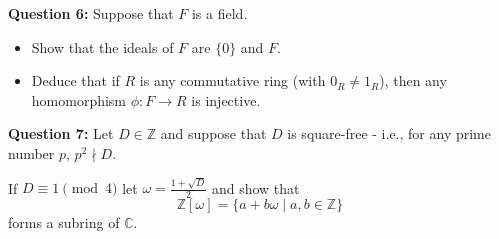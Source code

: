 \documentclass{article}
\begin{document}
\textbf{Question 6:} Suppose that $F$ is a field.
\begin{itemize}
    \item Show that the ideals of $F$ are $\{0\}$ and $F$.
    \item Deduce that if $R$ is any commutative ring (with $0_R \neq 1_R$), then any homomorphism $\phi: F \to R$ is injective.
\end{itemize}

\vspace{5mm}

\textbf{Question 7:} Let $D \in \mathbb{Z}$ and suppose that $D$ is square-free - i.e., for any prime number $p$, $p^2 \nmid D$.

If $D \equiv 1 \pmod{4}$ let $\omega = \frac{1 + \sqrt{D}}{2}$ and show that 
$$\mathbb{Z}[\omega] = \{ a + b\omega \mid a,b \in \mathbb{Z} \}$$
forms a subring of $\mathbb{C}$.
\end{document}
